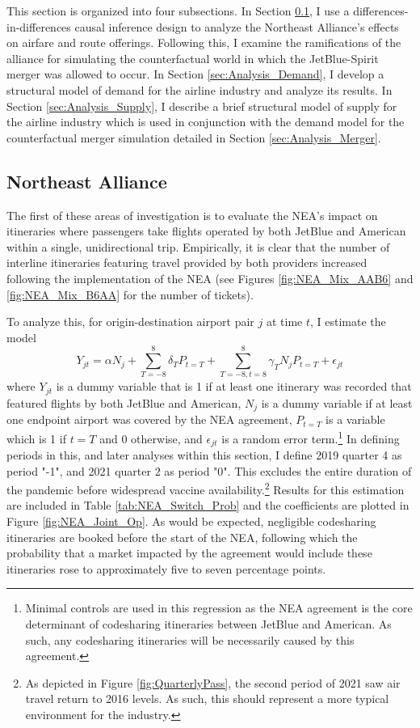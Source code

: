 \documentclass{article}
\begin{document}
	This section is organized into four subsections. In Section \ref{sec:Analysis_NEA}, I use a differences-in-differences causal inference design to analyze the Northeast Alliance's effects on airfare and route offerings. Following this, I examine the ramifications of the alliance for simulating the counterfactual world in which the JetBlue-Spirit merger was allowed to occur. In Section \ref{sec:Analysis_Demand}, I develop a structural model of demand for the airline industry and analyze its results. In Section \ref{sec:Analysis_Supply}, I describe a brief structural model of supply for the airline industry which is used in conjunction with the demand model for the counterfactual merger simulation detailed in Section \ref{sec:Analysis_Merger}. 
	
	\subsection{Northeast Alliance}
	\label{sec:Analysis_NEA}

    
        
	The first of these areas of investigation is to evaluate the NEA's impact on itineraries where passengers take flights operated by both JetBlue and American within a single, unidirectional trip. Empirically, it is clear that the number of interline itineraries featuring travel provided by both providers increased following the implementation of the NEA (see Figures \ref{fig:NEA_Mix_AAB6} and \ref{fig:NEA_Mix_B6AA} for the number of tickets). 
	
	To analyze this, for origin-destination airport pair $j$ at time $t$,  I estimate the model \[Y_{jt} = \alpha N_{j} + \sum_{T = -8}^{8} \delta_{T} P_{t = T} + \sum_{T = -8, t = 8}^{8} \gamma_{T} N_{j} P_{t = T} + \epsilon_{jt}\] where $Y_{jt}$ is a dummy variable that is 1 if at least one itinerary was recorded that featured flights by both JetBlue and American,  $N_{j}$ is a dummy variable if at least one endpoint airport was covered by the NEA agreement, $P_{t = T}$ is a variable which is 1 if $t = T$ and 0 otherwise, and $\epsilon_{jt}$ is a random error term.\footnote{Minimal controls are used in this regression as the NEA agreement is the core determinant of codesharing itineraries between JetBlue and American. As such, any codesharing itineraries will be necessarily caused by this agreement.} In defining periods in this, and later analyses within this section, I define 2019 quarter 4 as period "-1", and 2021 quarter 2 as period "0". This excludes the entire duration of the pandemic before widespread vaccine availability.\footnote{As depicted in Figure \ref{fig:QuarterlyPass}, the second period of 2021 saw air travel return to 2016 levels. As such, this should represent a more typical environment for the industry.} Results for this estimation are included in Table \ref{tab:NEA_Switch_Prob} and the coefficients are plotted in Figure \ref{fig:NEA_Joint_Op}. As would be expected, negligible codesharing itineraries are booked before the start of the NEA, following which the probability that a market impacted by the agreement would include these itineraries rose to approximately five to seven percentage points. 
	
\end{document}
